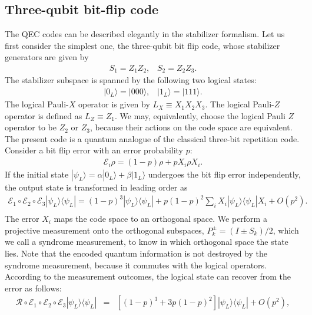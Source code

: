 \subsection*{Three-qubit bit-flip code}
The QEC codes can be  described elegantly in the stabilizer formalism.
Let us first consider the simplest one, the three-qubit bit flip code, whose stabilizer generators are given by
%
\begin{eqnarray}
S_{1} = Z_{1}Z_{2} , \;\;\; S_{2} = Z_{2}Z_{3}.
\end{eqnarray}
%
The stabilizer subspace is spanned by the following two logical states:
%
\begin{eqnarray}
|0_{L} \rangle = |000\rangle , \;\;\; |1_{L} \rangle=|111\rangle.
\end{eqnarray}
%
The logical Pauli-$X$ operator is given by $L_X \equiv X_{1}X_{2}X_{3}$.
The logical Pauli-$Z$ operator is defined as $L_Z\equiv Z_{1}$.
We may, equivalently, choose the logical Pauli $Z$ operator to be $Z_2$ or $Z_3$, because their actions on the code space are equivalent.
The present code is a quantum analogue of the classical three-bit repetition code.
Consider a bit flip error with an error probability $p$:
%
\begin{eqnarray}
\mathcal{E}_{i} \rho = (1-p) \rho + p X_{i} \rho X_{i}.
\end{eqnarray}
%
If the initial state $|\psi _{L} \rangle = \alpha|0_{L} \rangle +\beta |1_{L}\rangle $ undergoes the bit flip error independently, the output state is transformed in leading order as
%
\begin{eqnarray}
\mathcal{E} _{1} \circ \mathcal{E} _{2} \circ \mathcal{E} _{3}| \psi _{L} \rangle \langle \psi _{L} |
=  (1-p) ^3 | \psi _{L} \rangle \langle \psi _{L} |+p (1-p)^2 \sum_{i} X_{i} | \psi _{L}\rangle \langle \psi _{L} | X_{i} + O (p^2).
\nonumber \\
\label{eq:noise}
\end{eqnarray}
%
The error $X_i$ maps the code space to an orthogonal space.
We perform a projective measurement onto the orthogonal subspaces, $P_{k}^{\pm} = (I \pm S_{k})/2$, which we call a syndrome measurement, to know in which orthogonal space the state lies.
Note that the encoded quantum information is not destroyed by the syndrome measurement, because it commutes with the logical operators.
According to the measurement outcomes, the logical state can recover from the error as follows:
%
\begin{eqnarray}
\mathcal{R} \circ \mathcal{E} _{1} \circ \mathcal{E} _{2} \circ \mathcal{E} _{3}| \psi _{L} \rangle \langle \psi _{L} |
&=& [(1-p)^3 + 3p(1-p)^2 ] | \psi _{L} \rangle \langle \psi _{L} | + O(p^2),
\label{eq:recovery}
\end{eqnarray}
